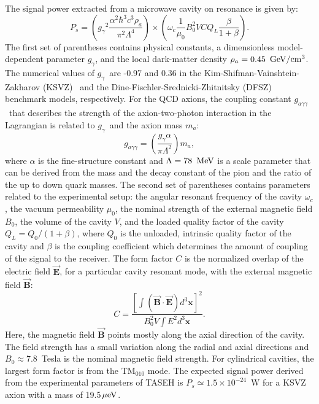 \documentclass[%
 reprint,prl, %
 amsmath,amssymb,
 aps,
]{revtex4-2}
\newcommand{\bgagg}{\ensuremath{g_{a\gamma\gamma}}}
\newcommand{\bggamma}{\ensuremath{g_{\gamma}}}
\newcommand{\ma}{\ensuremath{m_a}}
\newcommand{\muevcc}{\ensuremath{\,\mu\text{e\hspace{-.08em}V}}}
\newcommand{\MeV}{\ensuremath{\,\text{Me\hspace{-.08em}V}}}
\newcommand{\GeV}{\ensuremath{\,\text{Ge\hspace{-.08em}V}}}
\begin{document}
The signal power extracted from a microwave cavity on resonance is given 
by:
\begin{equation}
P_s = \left(\bggamma^2\frac{\alpha^2\hbar^3c^3\rho_a}{\pi^2\Lambda^4}\right)\times
\left(\omega_c\frac{1}{\mu_0}B_0^2VCQ_L\frac{\beta}{1+\beta}\right).
\label{eq:ps}
\end{equation}
The first set of parentheses contains physical constants, 
a dimensionless model-dependent parameter \bggamma, and 
the local dark-matter density $\rho_a=0.45~\GeV/\mathrm{cm}^3$. 
The numerical values of \bggamma\ are -0.97 and 0.36 
in the Kim-Shifman-Vainshtein-Zakharov (KSVZ)~\cite{KSVZI,KSVZII} and 
the Dine-Fischler-Srednicki-Zhitnitsky (DFSZ)~\cite{DFSZI,DFSZII} benchmark 
models, respectively. For the QCD axions, the coupling constant \bgagg\ that 
describes the strength of the axion-two-photon interaction in the Lagrangian 
is related to \bggamma\ and the axion mass \ma: 
\begin{equation}
 \bgagg = \left(\frac{\bggamma\alpha}{\pi \Lambda^2}\right)\ma, 
\label{eq:grelation}
\end{equation}
where $\alpha$ is the 
fine-structure constant and  $\Lambda=78~\MeV$ is a scale parameter that can 
be derived from the mass and the decay constant of the pion and the ratio of 
the up to down quark masses. 
%
The second set of parentheses contains parameters related to the experimental 
setup: the angular resonant frequency of the cavity $\omega_c$, 
the vacuum permeability $\mu_0$, the nominal strength of the external magnetic 
field $B_0$, the volume of the cavity $V$, and the loaded quality factor of 
the cavity \(Q_L=Q_0/(1+\beta)\), where $Q_0$ is the unloaded, intrinsic 
quality factor of the cavity and $\beta$ is the coupling coefficient which 
determines the amount 
of coupling of the signal to the receiver. The form factor $C$ is the 
normalized overlap of the electric field 
$\vec{\bm{E}}$, for a particular cavity resonant mode, with the external 
magnetic field $\vec{\bm{B}}$:
\begin{equation}
  C = \frac{\left[\int\left( \vec{\bm{B}}\cdot\vec{\bm{E}}\right) d^3\bm{x}\right]^2}{B_0^2V\int E^2 d^3\bm{x}}.
\label{eq:formfactor} 
\end{equation} 
Here, the magnetic field $\vec{\bm{B}}$ points mostly along the axial 
direction of the cavity. The field strength has a small variation along the 
radial and axial directions and $B_0\approx7.8$~Tesla is the nominal magnetic 
field strength. 
For cylindrical cavities, the largest form factor is from the 
TM$_{010}$ mode. The expected signal power derived from the experimental 
parameters of TASEH is $P_s\simeq 1.5\times10^{-24}$~W for a KSVZ axion 
with a mass of 19.5\muevcc. 
\end{document}
